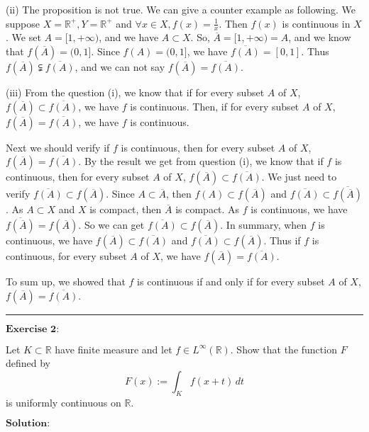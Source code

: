 \documentclass[12pt,a4paper]{ctexart}
\begin{document}
(ii) The proposition is not true. We can give a counter example as following. We suppose $X = \mathbb{R}^{+}, Y = \mathbb{R}^{+}$ and $\forall x \in X, f(x) = \frac{1}{x}$. Then $f(x)$ is continuous in $X$. We set $A = [1, + \infty)$, and we have $A \subset X$. So, $\overline{A} = [1, + \infty) = A$, and we know that $f(\overline{A}) = (0, 1]$. Since $f(A) = (0, 1]$, we have $\overline{f(A)} = [0, 1]$. Thus $f(\overline{A}) \subsetneqq \overline{f(A)}$, and we can not say $f(\overline{A}) = \overline{f(A)}$.

(iii) From the question (i), we know that if for every subset $A$ of $X$, $f(\overline{A}) \subset  \overline{f(A)}$, we have $f$ is continuous. Then, if for every subset $A$ of $X$, $f(\overline{A}) = \overline{f(A)}$, we have $f$ is continuous. 

Next we should verify if $f$ is continuous, then for every subset $A$ of $X$, $f(\overline{A}) = \overline{f(A)}$. By the result we get from question (i), we know that if $f$ is continuous, then for every subset $A$ of $X$, $f(\overline{A}) \subset  \overline{f(A)}$. We just need to verify $\overline{f(A)} \subset  f(\overline{A})$. Since $A \subset \overline{A}$, then $f(A) \subset f(\overline{A})$ and $\overline{f(A)} \subset \overline{f(\overline{A})}$. As $A \subset X$ and $X$ is compact, then $\overline{A}$ is compact. As $f$ is continuous, we have $\overline{f(\overline{A})} = f(\overline{A})$. So we can get $\overline{f(A)} \subset  f(\overline{A})$. In summary, when $f$ is continuous, we have $f(\overline{A}) \subset  \overline{f(A)}$ and $\overline{f(A)} \subset  f(\overline{A})$. Thus if $f$ is continuous, for every subset $A$ of $X$, we have $f(\overline{A}) = \overline{f(A)}$.

To sum up, we showed that $f$ is continuous if and only if for every subset $A$ of $X$, $f(\overline{A}) = \overline{f(A)}$.


\noindent\rule[0.25\baselineskip]{\textwidth}{0.5pt}

\vspace{8pt}
$\textbf{Exercise 2:}$

Let $K \subset \mathbb{R}$ have finite measure and let $f \in L^{\infty} (\mathbb{R})$. Show that the function $F$ defined by 
\begin{equation*}
   F(x):= \int_{K}^{} f(x + t) \, d t
\end{equation*}
is uniformly continuous on $\mathbb{R}$.

\vspace{8pt}
$\textbf{Solution:}$
\end{document}
